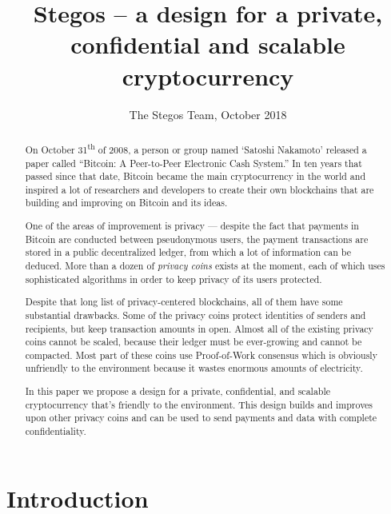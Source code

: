 \documentclass[a4paper, 10pt, conference]{ieeeconf}
\title{\LARGE \bf
Stegos  -- a design for a private, confidential and scalable cryptocurrency}
\author{The Stegos Team, October 2018}%
\begin{document}
\maketitle
\thispagestyle{empty}
\pagestyle{empty}


\begin{abstract}

    On October 31\textsuperscript{th} of 2008, a person or group named ‘Satoshi Nakamoto’ released a paper called ``Bitcoin: A Peer-to-Peer Electronic Cash System.''\cite{c1} In ten years that passed since that date, Bitcoin became the main cryptocurrency in the world and inspired a lot of researchers and developers to create their own blockchains that are building and improving on Bitcoin and its ideas.
    
    One of the areas of improvement is privacy --- despite the fact that payments in Bitcoin are conducted between pseudonymous users, the payment transactions are stored in a public decentralized ledger, from which a lot of information can be deduced. More than a dozen of \textit{privacy coins} exists at the moment, each of which uses sophisticated algorithms in order to keep privacy of its users protected. 
    
    Despite that long list of privacy-centered blockchains, all of them have some substantial drawbacks. Some of the privacy coins protect identities of senders and recipients, but keep transaction amounts in open. Almost all of the existing privacy coins cannot be scaled, because their ledger must be ever-growing and cannot be compacted. Most part of these coins use Proof-of-Work consensus which is obviously unfriendly to the environment because it wastes enormous amounts of electricity. 
    
    In this paper we propose a design for a private, confidential, and scalable cryptocurrency that’s friendly to the environment. This design builds and improves upon other privacy coins and can be used to send payments and data with complete confidentiality. 

\end{abstract}


\section{Introduction}
\end{document}
